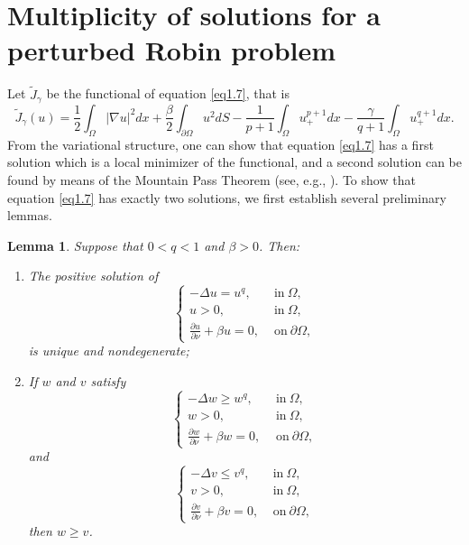 \documentclass[12pt,reqno]{amsart}
\numberwithin{equation}{section}
\newtheorem{lemma}[theorem]{Lemma}
\theoremstyle{definition}
\begin{document}
\section{Multiplicity of solutions for a perturbed Robin problem}


Let $\tilde{J}_\gamma$ be the functional of equation \eqref{eq1.7}, that is 
$$
\tilde{J}_\gamma (u)=\frac{1}{2}\int_{\Omega}|\nabla u|^2dx+\frac{\beta}{2}\int_{\partial\Omega}u^2dS-\frac{1}{p+1}\int_\Omega u_+^{p+1}dx-\frac{\gamma}{q+1}\int_{\Omega}u_+^{q+1}dx.
$$
From the variational structure, one can show that equation \eqref{eq1.7} has a first solution which is a local minimizer of the functional, and a second solution can be found by means of the Mountain Pass Theorem (see, e.g., \cite{ABC}). To show that equation \eqref{eq1.7} has exactly two solutions, we first establish several preliminary lemmas. 


\begin{lemma}\label{lemma4.1}
Suppose that $0<q<1$ and $\beta>0$. Then:
\begin{enumerate}
\item The positive solution of 
\begin{equation}\label{l4.1}
\begin{cases}
-\Delta u=u^q,\quad &\text{in}\ \Omega,\\
u>0, &\text{in}\ \Omega,\\
\frac{\partial u}{\partial \nu}+\beta u=0, &\text{on}\ \partial \Omega,
\end{cases}
\end{equation}
is unique and nondegenerate; 
\item  If $w$ and $v$ satisfy 
\begin{equation*}
\begin{cases}
-\Delta w\ge w^q,\quad &\text{in}\ \Omega,\\
w>0, &\text{in}\ \Omega,\\
\frac{\partial w}{\partial \nu}+\beta w=0, &\text{on}\ \partial \Omega,
\end{cases}
\end{equation*}
and
\begin{equation*}
\begin{cases}
-\Delta v\le v^q,\quad &\text{in}\ \Omega,\\
v>0, &\text{in}\ \Omega,\\
\frac{\partial v}{\partial \nu}+\beta v=0, &\text{on}\ \partial \Omega,
\end{cases}
\end{equation*}
then $w\ge v$.
\end{enumerate}
\end{lemma}
\end{document}
